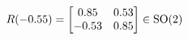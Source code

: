 \documentclass[preview]{standalone}
\begin{document}
\begin{align*}
\special{dvisvgm:raw <g id='unique000'>}R(-0.55) = \begin{bmatrix} 0.85 & 0.53 \\ -0.53 & 0.85 \end{bmatrix} \in \text{SO}(2)\special{dvisvgm:raw </g>}
\end{align*}
\end{document}
